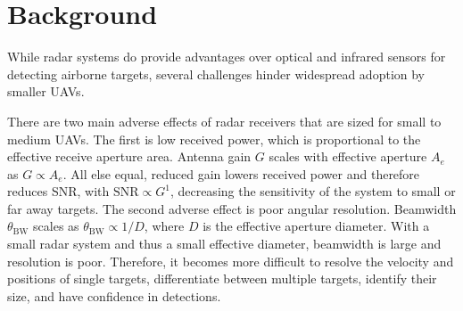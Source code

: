 \chapter{Background}

While radar systems do provide advantages over optical and infrared sensors for detecting airborne targets, several challenges hinder widespread adoption by smaller UAVs.

There are two main adverse effects of radar receivers that are sized for small to medium UAVs. The first is low received power, which is proportional to the effective receive aperture area. Antenna gain \(G\) scales with effective aperture \(A_e\) as \(G \propto A_e\). All else equal, reduced gain lowers received power and therefore reduces SNR, with \(\mathrm{SNR} \propto G^1\), decreasing the sensitivity of the system to small or far away targets. The second adverse effect is poor angular resolution. Beamwidth \(\theta_{\mathrm{BW}}\) scales as \(\theta_{\mathrm{BW}} \propto 1/D\), where \(D\) is the effective aperture diameter. With a small radar system and thus a small effective diameter, beamwidth is large and resolution is poor. Therefore, it becomes more difficult to resolve the velocity and positions of single targets, differentiate between multiple targets, identify their size, and have confidence in detections. 





